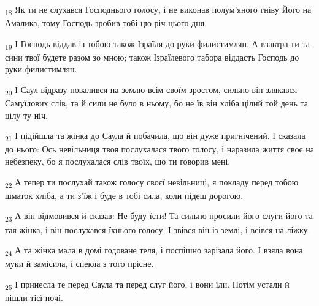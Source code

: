 \begin{tcolorbox}
\textsubscript{18} Як ти не слухався Господнього голосу, і не виконав полум'яного гніву Його на Амалика, тому Господь зробив тобі цю річ цього дня.
\end{tcolorbox}
\begin{tcolorbox}
\textsubscript{19} І Господь віддав із тобою також Ізраїля до руки филистимлян. А взавтра ти та сини твої будете разом зо мною; також Ізраїлевого табора віддасть Господь до руки филистимлян.
\end{tcolorbox}
\begin{tcolorbox}
\textsubscript{20} І Саул відразу повалився на землю всім своїм зростом, сильно він злякався Самуїлових слів, та й сили не було в ньому, бо не їв він хліба цілий той день та цілу ту ніч.
\end{tcolorbox}
\begin{tcolorbox}
\textsubscript{21} І підійшла та жінка до Саула й побачила, що він дуже пригнічений. І сказала до нього: Ось невільниця твоя послухалася твого голосу, і наразила життя своє на небезпеку, бо я послухалася слів твоїх, що ти говорив мені.
\end{tcolorbox}
\begin{tcolorbox}
\textsubscript{22} А тепер ти послухай також голосу своєї невільниці, я покладу перед тобою шматок хліба, а ти з'їж і буде в тобі сила, коли підеш дорогою.
\end{tcolorbox}
\begin{tcolorbox}
\textsubscript{23} А він відмовився й сказав: Не буду їсти! Та сильно просили його слуги його та тая жінка, і він послухався їхнього голосу. І звівся він із землі, і всівся на ліжку.
\end{tcolorbox}
\begin{tcolorbox}
\textsubscript{24} А та жінка мала в домі годоване теля, і поспішно зарізала його. І взяла вона муки й замісила, і спекла з того прісне.
\end{tcolorbox}
\begin{tcolorbox}
\textsubscript{25} І принесла те перед Саула та перед слуг його, і вони їли. Потім устали й пішли тієї ночі.
\end{tcolorbox}
